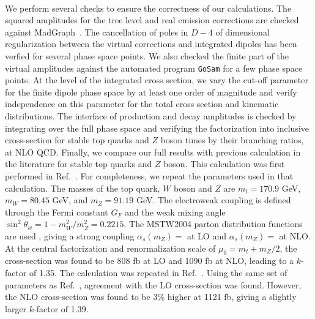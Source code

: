 \documentclass[preprint]{JHEP3} %
\begin{document}
\\
We perform several checks to ensure the correctness of our calculations. 
The squared amplitudes for the tree level and real emission corrections are checked against MadGraph~\cite{Alwall:2011uj}. 
The cancellation of poles in $D-4$ of dimensional regularization between the virtual corrections and integrated dipoles has been verfied for several phase space points.
We also checked the finite part of the virtual amplitudes against the automated program {\tt GoSam} \cite{Cullen:2011ac} for a few phase space points.  
At the level of the integrated cross section, we vary the cut-off parameter for the finite dipole phase space by at least one order of magnitude and 
verify independence on this parameter for the total cross section and kinematic distributions.
The interface of production and decay amplitudes is checked by integrating over the full phase space and verifying the factorization into 
inclusive cross-section for stable top quarks and $Z$ boson times by their branching ratios, at NLO QCD.
% 
Finally, we compare our full results with previous calculation in the literature for stable top quarks and $Z$ boson.
This calculation was first performed in Ref.~\cite{Lazopoulos:2008de}. 
For completeness, we repeat the parameters used in that calculation. 
The masses of the top quark, $W$ boson and $Z$ are $m_t=170.9$ GeV, $m_W=80.45$ GeV, and $m_Z=91.19$ GeV. 
The electroweak coupling is defined through the Fermi constant $G_F$ and the weak mixing angle $\sin^2\theta_w = 1-m_W^2/m_Z^2 =0.2215$. 
The MSTW2004 parton distribution functions are used \cite{}, giving a strong coupling $\alpha_s(m_Z)=$ at LO and $\alpha_s(m_Z)=$ at NLO. 
At the central factorization and renormalization scale of $\mu_0=m_t+m_Z/2$, the cross-section was found to be 808 fb at LO and 1090 fb at NLO, leading to a $k$-factor of 1.35. 
The calculation was repeated in Ref.~\cite{Kardos:2011na}.  
Using the same set of parameters as Ref.~\cite{Lazopoulos:2008de}, agreement with the LO cross-section was found. 
However, the NLO cross-section was found to be 3\% higher at 1121 fb, giving a slightly larger $k$-factor of 1.39. 



\end{document}
